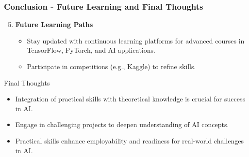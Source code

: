 \documentclass[aspectratio=169]{beamer}
\begin{document}
\begin{frame}[fragile]
    \frametitle{Conclusion - Future Learning and Final Thoughts}
    \begin{enumerate}
        \setcounter{enumi}{4}
        \item \textbf{Future Learning Paths}
        \begin{itemize}
            \item Stay updated with continuous learning platforms for advanced courses in TensorFlow, PyTorch, and AI applications.
            \item Participate in competitions (e.g., Kaggle) to refine skills.
        \end{itemize}
    \end{enumerate}

    \begin{block}{Final Thoughts}
        \begin{itemize}
            \item Integration of practical skills with theoretical knowledge is crucial for success in AI.
            \item Engage in challenging projects to deepen understanding of AI concepts.
            \item Practical skills enhance employability and readiness for real-world challenges in AI.
        \end{itemize}
    \end{block}
\end{frame}
\end{document}
